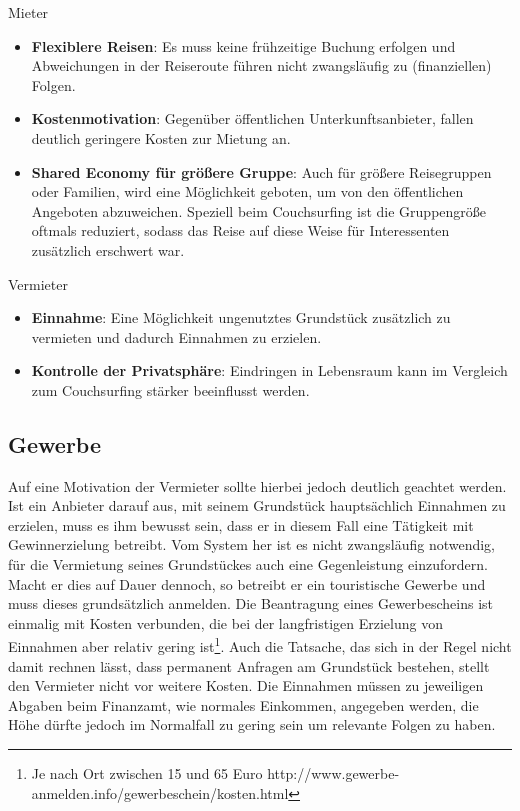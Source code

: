 Mieter
\begin{itemize}
   \item 
   \textbf{Flexiblere Reisen}: Es muss keine frühzeitige Buchung erfolgen und Abweichungen in der Reiseroute führen nicht zwangsläufig zu (finanziellen) Folgen.

   \item 
   \textbf{Kostenmotivation}: Gegenüber öffentlichen Unterkunftsanbieter, fallen deutlich geringere Kosten zur Mietung an. 

   \item 
   \textbf{Shared Economy für größere Gruppe}: Auch für größere Reisegruppen oder Familien, wird eine Möglichkeit geboten, um von den öffentlichen Angeboten abzuweichen. Speziell beim Couchsurfing ist die Gruppengröße oftmals reduziert, sodass das Reise auf diese Weise für Interessenten zusätzlich erschwert war.

\end{itemize}

\newpage
Vermieter
\begin{itemize}
   \item 
   \textbf{Einnahme}: Eine Möglichkeit ungenutztes Grundstück zusätzlich zu vermieten und dadurch Einnahmen zu erzielen.

   \item 
   \textbf{Kontrolle der Privatsphäre}: Eindringen in Lebensraum kann im Vergleich zum Couchsurfing stärker beeinflusst werden.
   
\end{itemize}


\subsection{Gewerbe}
Auf eine Motivation der Vermieter sollte hierbei jedoch deutlich geachtet werden. Ist ein Anbieter darauf aus, mit seinem Grundstück hauptsächlich Einnahmen zu erzielen, muss es ihm bewusst sein, dass er in diesem Fall eine Tätigkeit mit Gewinnerzielung betreibt. Vom System her ist es nicht zwangsläufig notwendig, für die Vermietung seines Grundstückes auch eine Gegenleistung einzufordern. Macht er dies auf Dauer dennoch, so betreibt er ein touristische Gewerbe und muss dieses grundsätzlich anmelden. Die Beantragung eines Gewerbescheins ist einmalig mit Kosten verbunden, die bei der langfristigen Erzielung von Einnahmen aber relativ gering ist\footnote{Je nach Ort zwischen 15 und 65 Euro http://www.gewerbe-anmelden.info/gewerbeschein/kosten.html}. Auch die Tatsache, das sich in der Regel nicht damit rechnen lässt, dass permanent Anfragen am Grundstück bestehen, stellt den Vermieter nicht vor weitere Kosten. Die Einnahmen müssen zu jeweiligen Abgaben beim Finanzamt, wie normales Einkommen, angegeben werden, die Höhe dürfte jedoch im Normalfall zu gering sein um relevante Folgen zu haben.\\

